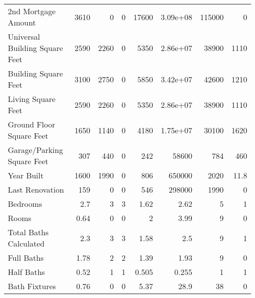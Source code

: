\begin{tabular}{lrrrrrrr}
 2nd Mortgage Amount            &   3610        &      0        &      0        &  17600        &      3.09e+08 & 115000        &      0        \\
 Universal Building Square Feet &   2590        &   2260        &      0        &   5350        &      2.86e+07 &  38900        &   1110        \\
 Building Square Feet           &   3100        &   2750        &      0        &   5850        &      3.42e+07 &  42600        &   1210        \\
 Living Square Feet             &   2590        &   2260        &      0        &   5350        &      2.86e+07 &  38900        &   1110        \\
 Ground Floor Square Feet       &   1650        &   1140        &      0        &   4180        &      1.75e+07 &  30100        &   1620        \\
 Garage/Parking Square Feet     &    307        &    440        &      0        &    242        &  58600        &    784        &    460        \\
 Year Built                     &   1600        &   1990        &      0        &    806        & 650000        &   2020        &     11.8      \\
 Last Renovation                &    159        &      0        &      0        &    546        & 298000        &   1990        &      0        \\
 Bedrooms                       &      2.7      &      3        &      3        &      1.62     &      2.62     &      5        &      1        \\
 Rooms                          &      0.64     &      0        &      0        &      2        &      3.99     &      9        &      0        \\
 Total Baths Calculated         &      2.3      &      3        &      3        &      1.58     &      2.5      &      9        &      1        \\
 Full Baths                     &      1.78     &      2        &      2        &      1.39     &      1.93     &      9        &      0        \\
 Half Baths                     &      0.52     &      1        &      1        &      0.505    &      0.255    &      1        &      1        \\
 Bath Fixtures                  &      0.76     &      0        &      0        &      5.37     &     28.9      &     38        &      0        \\

\end{tabular}
